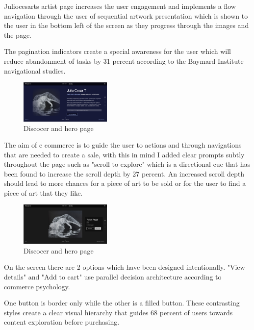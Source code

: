 \documentclass[]{project_final}
\begin{document}
Juliocesarts artist page increases the user engagement and implements a flow navigation through the user of sequential artwork presentation which is shown to the user in the bottom left of the screen as they progress through the images and the page.

The pagination indicators create a special awareness for the user which will reduce abandonment of tasks by 31 percent according to the Baymard Institute navigational studies.

\begin{figure}[ht!]
  \centering
  \includegraphics[width=0.4\textwidth]{AG17.png}
  \vspace*{0.0cm}
  \caption{Discocer and hero page}
  \label{fig:1}
\end{figure}

The aim of e commerce is to guide the user to actions and through navigations that are needed to create a sale, with this in mind I added clear prompts subtly throughout the page such as "scroll to explore" which is a directional cue that has been found to increase the scroll depth by 27 percent. An increased scroll depth should lead to more chances for a piece of art to be sold or for the user to find a piece of art that they like.

\begin{figure}[ht!]
  \centering
  \includegraphics[width=0.4\textwidth]{AG18.png}
  \vspace*{0.0cm}
  \caption{Discocer and hero page}
  \label{fig:1}
\end{figure}

On the screen there are 2 options which have been designed intentionally. "View details" and "Add to cart" use parallel decision architecture according to commerce psychology.

One button is border only while the other is a filled button. These contrasting styles create a clear visual hierarchy that guides 68 percent of users towards content exploration before purchasing.
\end{document}
